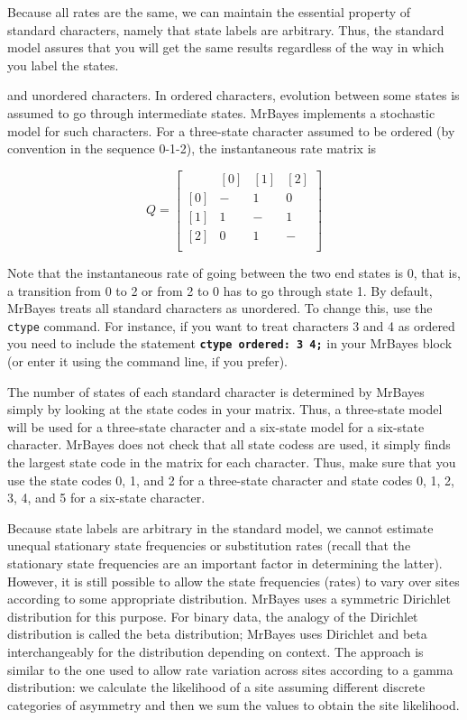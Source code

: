 \documentclass[12pt]{book}
\newcommand{\ttt}[1]{\texttt{#1} }
\newcommand{\tb}[1]{\texttt{\textbf{#1}} }
\begin{document}
Because all rates are the same, we can maintain the essential property of standard
characters, namely that state labels are arbitrary. Thus, the standard model assures that
you will get the same results regardless of the way in which you label the states.

and unordered characters. In ordered characters, evolution between some states is
assumed to go through intermediate states. MrBayes implements a stochastic model for
such characters. For a three-state character assumed to be ordered (by convention in the
sequence 0-1-2), the instantaneous rate matrix is

\[
Q=\begin{bmatrix}
    & [0] & [1] & [2]\\ 
 [0]& - & 1 & 0\\ 
 [1]& 1& -  & 1\\ 
 [2]& 0& 1  & -\\ 
\end{bmatrix}
\]

Note that the instantaneous rate of going between the two end states is 0, that is, a transition
from 0 to 2 or from 2 to 0 has to go through state 1. By default, MrBayes treats all standard
characters as unordered. To change this, use the \ttt{ctype} command. For instance, if you want to
treat characters 3 and 4 as ordered you need to include the statement \tb{ctype ordered: 3 4;} in
your MrBayes block (or enter it using the command line, if you prefer).

The number of states of each standard character is determined by MrBayes simply by looking at the
state codes in your matrix. Thus, a three-state model will be used for a three-state character and
a six-state model for a six-state character. MrBayes does not check that all state codess are used,
it simply finds the largest state code in the matrix for each character. Thus, make sure that you
use the state codes 0, 1, and 2 for a three-state character and state codes 0, 1, 2, 3, 4, and 5
for a six-state character.

Because state labels are arbitrary in the standard model, we cannot estimate unequal stationary
state frequencies or substitution rates (recall that the stationary state frequencies are an
important factor in determining the latter). However, it is still possible to allow the state
frequencies (rates) to vary over sites according to some appropriate distribution. MrBayes uses a
symmetric Dirichlet distribution for this purpose. For binary data, the analogy of the Dirichlet
distribution is called the beta distribution; MrBayes uses Dirichlet and beta interchangeably for
the distribution depending on context. The approach is similar to the one used to allow rate
variation across sites according to a gamma distribution: we calculate the likelihood of a site
assuming different discrete categories of asymmetry and then we sum the values to obtain the site
likelihood.
\end{document}
